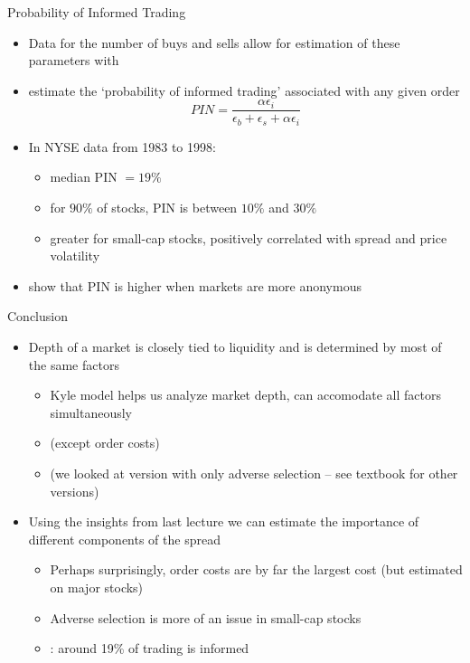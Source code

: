 \documentclass[english,10pt
,aspectratio=169
]{beamer}
\begin{document}
\begin{frame}{Probability of Informed Trading}
	\begin{itemize}
		\item Data for the number of buys and sells allow for estimation of these parameters with 
		\item \textbf{\citet*{easley_is_2002}} estimate the `probability of informed trading' associated with any given order
		\begin{equation} \tag{5.27}
		PIN = \frac{\alpha \epsilon_i}{\epsilon_b + \epsilon_s + \alpha \epsilon_i}
		\end{equation}
		\item In NYSE data from 1983 to 1998:
		\begin{itemize}
			\item median PIN $=19\%$
			\item for $90\%$ of stocks, PIN is between $10\%$ and $30\%$
			\item greater for small-cap stocks, positively correlated with spread and price volatility
		\end{itemize}
		\item \textbf{\citet*{grammig_knowing_2001}} show that PIN is higher when markets are more anonymous
	\end{itemize}
\end{frame}


\begin{frame}{Conclusion}
	\begin{itemize}
		\item Depth of a market is closely tied to liquidity and is determined by most of the same factors
		\begin{itemize}
			\item Kyle model helps us analyze market depth, can accomodate all factors simultaneously 
			\item (except order costs)
			\item (we looked at version with only adverse selection -- see textbook for other versions)
		\end{itemize}
		\item Using the insights from last lecture we can estimate the importance of different components of the spread
		\begin{itemize}
			\item Perhaps surprisingly, order costs are by far the largest cost (but estimated on major stocks)
			\item Adverse selection is more of an issue in small-cap stocks
			\item \cite{easley_is_2002}: around 19\% of trading is informed
		\end{itemize}
	\end{itemize}
\end{frame}
\end{document}
